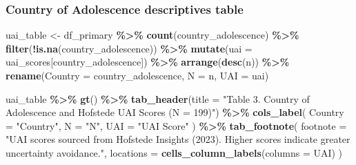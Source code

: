 \documentclass[
]{article}
\newenvironment{Shaded}{\begin{snugshade}}{\end{snugshade}}
\newcommand{\AttributeTok}[1]{\textcolor[rgb]{0.13,0.29,0.53}{#1}}
\newcommand{\FunctionTok}[1]{\textcolor[rgb]{0.13,0.29,0.53}{\textbf{#1}}}
\newcommand{\NormalTok}[1]{#1}
\newcommand{\OtherTok}[1]{\textcolor[rgb]{0.56,0.35,0.01}{#1}}
\newcommand{\SpecialCharTok}[1]{\textcolor[rgb]{0.81,0.36,0.00}{\textbf{#1}}}
\newcommand{\StringTok}[1]{\textcolor[rgb]{0.31,0.60,0.02}{#1}}
\begin{document}
\subsubsection{Country of Adolescence descriptives
table}\label{country-of-adolescence-descriptives-table}

\begin{Shaded}
\begin{Highlighting}[]
\NormalTok{uai\_table }\OtherTok{\textless{}{-}}\NormalTok{ df\_primary }\SpecialCharTok{\%\textgreater{}\%}
  \FunctionTok{count}\NormalTok{(country\_adolescence) }\SpecialCharTok{\%\textgreater{}\%}
  \FunctionTok{filter}\NormalTok{(}\SpecialCharTok{!}\FunctionTok{is.na}\NormalTok{(country\_adolescence)) }\SpecialCharTok{\%\textgreater{}\%}
  \FunctionTok{mutate}\NormalTok{(}\AttributeTok{uai =}\NormalTok{ uai\_scores[country\_adolescence]) }\SpecialCharTok{\%\textgreater{}\%}
  \FunctionTok{arrange}\NormalTok{(}\FunctionTok{desc}\NormalTok{(n)) }\SpecialCharTok{\%\textgreater{}\%}
  \FunctionTok{rename}\NormalTok{(}\AttributeTok{Country =}\NormalTok{ country\_adolescence, }\AttributeTok{N =}\NormalTok{ n, }\AttributeTok{UAI =}\NormalTok{ uai)}

\NormalTok{uai\_table }\SpecialCharTok{\%\textgreater{}\%}
  \FunctionTok{gt}\NormalTok{() }\SpecialCharTok{\%\textgreater{}\%}
  \FunctionTok{tab\_header}\NormalTok{(}\AttributeTok{title =} \StringTok{"Table 3. Country of Adolescence and Hofstede UAI Scores (N = 199)"}\NormalTok{) }\SpecialCharTok{\%\textgreater{}\%}
  \FunctionTok{cols\_label}\NormalTok{(}
    \AttributeTok{Country =} \StringTok{"Country"}\NormalTok{,}
    \AttributeTok{N       =} \StringTok{"N"}\NormalTok{,}
    \AttributeTok{UAI     =} \StringTok{"UAI Score"}
\NormalTok{  ) }\SpecialCharTok{\%\textgreater{}\%}
  \FunctionTok{tab\_footnote}\NormalTok{(}
    \AttributeTok{footnote =} \StringTok{"UAI scores sourced from Hofstede Insights (2023). Higher scores indicate greater uncertainty avoidance."}\NormalTok{,}
    \AttributeTok{locations =} \FunctionTok{cells\_column\_labels}\NormalTok{(}\AttributeTok{columns =}\NormalTok{ UAI)}
\NormalTok{  )}
\end{Highlighting}
\end{Shaded}
\end{document}
